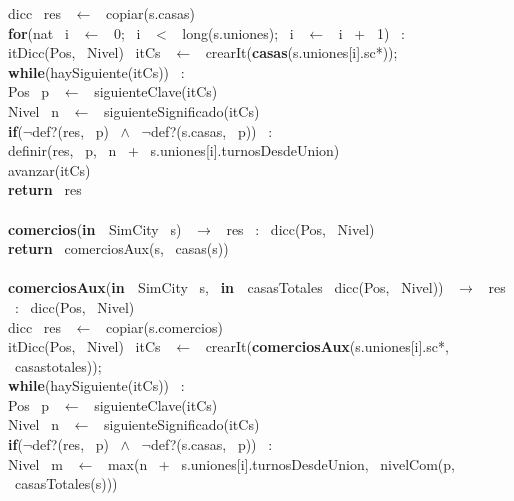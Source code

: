 \indent dicc \ res \ $\leftarrow$ \ copiar(s.casas)\\
\indent \textbf{for}(nat \ i \ $\leftarrow$ \ 0; \ i \ $<$ \ long(s.uniones); \ i \ $\leftarrow$ \ i \ + \ 1) \ : \ \\
\indent \indent itDicc(Pos, \ Nivel) \ itCs \ $\leftarrow$ \ crearIt(\textbf{casas}(s.uniones[i].sc*));\\
\indent \indent \textbf{while}(haySiguiente(itCs)) \ :\\
\indent \indent \indent Pos \ p \ $\leftarrow$ \ siguienteClave(itCs)\\
\indent \indent \indent Nivel \ n \ $\leftarrow$ \ siguienteSignificado(itCs)\\
\indent \indent \indent \textbf{if}($\neg$def?(res, \ p) \ $\wedge$ \ $\neg$def?(s.casas, \ p)) \ :\\
\indent \indent \indent \indent definir(res, \ p, \ n \ + \ s.uniones[i].turnosDesdeUnion)\\
\indent \indent \indent avanzar(itCs)\\
\indent \textbf{return} \ res\\
\noindent\makebox[\linewidth]{\rule{\textwidth}{0.4pt}}
\\
\noindent\makebox[\linewidth]{\rule{\textwidth}{0.4pt}}
\textbf{comercios}(\textbf{in \ }SimCity \ s) \ $\rightarrow $ \ res \ : \ dicc(Pos, \ Nivel)\\
\indent \textbf{return} \ comerciosAux(s, \ casas(s))\\
\\
\textbf{comerciosAux}(\textbf{in \ }SimCity \ s, \ \textbf{in \ }casasTotales \ dicc(Pos, \ Nivel)) \ $\rightarrow $ \ res \ : \ dicc(Pos, \ Nivel)\\
\indent dicc \ res \ $\leftarrow$ \ copiar(s.comercios)\\
\indent itDicc(Pos, \ Nivel) \ itCs \ $\leftarrow$ \ crearIt(\textbf{comerciosAux}(s.uniones[i].sc*, \ casastotales));\\
\indent \textbf{while}(haySiguiente(itCs)) \ :\\
\indent \indent Pos \ p \ $\leftarrow$ \ siguienteClave(itCs)\\
\indent \indent Nivel \ n \ $\leftarrow$ \ siguienteSignificado(itCs)\\
\indent \indent \textbf{if}($\neg$def?(res, \ p) \ $\wedge$ \ $\neg$def?(s.casas, \ p)) \ :\\
\indent \indent \indent Nivel \ m \ $\leftarrow$ \ max(n \ + \ s.uniones[i].turnosDesdeUnion, \ nivelCom(p, \ casasTotales(s)))\\
